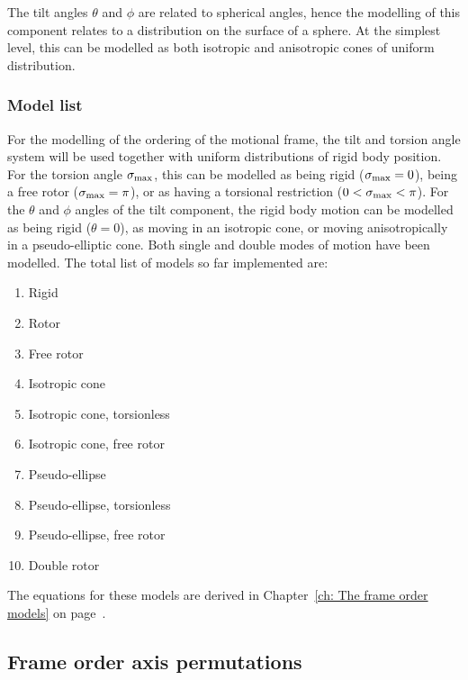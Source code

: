 The tilt angles $\theta$ and $\phi$ are related to spherical angles, hence the modelling of this component relates to a distribution on the surface of a sphere.
At the simplest level, this can be modelled as both isotropic and anisotropic cones of uniform distribution.





\subsubsection{Model list}

For the modelling of the ordering of the motional frame, the tilt and torsion angle system will be used together with uniform distributions of rigid body position.
For the torsion angle $\sigma_{\textrm{max}}$, this can be modelled as being rigid ($\sigma_{\textrm{max}} = 0$), being a free rotor ($\sigma_{\textrm{max}} = \pi$), or as having a torsional restriction ($0 < \sigma_{\textrm{max}} < \pi$).
For the $\theta$ and $\phi$ angles of the tilt component, the rigid body motion can be modelled as being rigid ($\theta = 0$), as moving in an isotropic cone, or moving anisotropically in a pseudo-elliptic cone.
Both single and double modes of motion have been modelled.
The total list of models so far implemented are:
\begin{enumerate}
    \item Rigid
    \item Rotor
    \item Free rotor
    \item Isotropic cone
    \item Isotropic cone, torsionless
    \item Isotropic cone, free rotor
    \item Pseudo-ellipse
    \item Pseudo-ellipse, torsionless
    \item Pseudo-ellipse, free rotor
    \item Double rotor
\end{enumerate}

The equations for these models are derived in Chapter~\ref{ch: The frame order models} on page~\pageref{ch: The frame order models}.



\subsection{Frame order axis permutations}
\label{sect: axis permutations}

